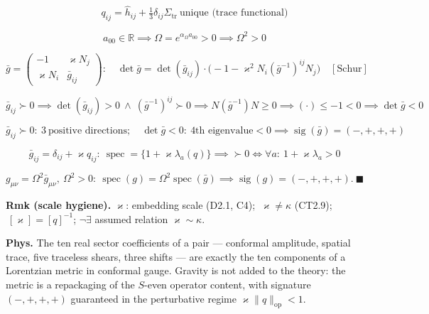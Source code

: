 \begin{theorem}
\[
\qquad q_{ij}=\hat h_{ij}+\tfrac13\delta_{ij}\Sigma_{\mathrm{tr}}\ \text{unique (trace functional)}
\]

\[
a_{00}\in\mathbb R\implies\Omega=e^{\alpha_\Omega a_{00}}>0\implies\Omega^2>0
\]

\[
\bar g=\begin{pmatrix}-1&\varkappa N_j\\ \varkappa N_i&\bar g_{ij}\end{pmatrix}:\quad
\det\bar g=\det(\bar g_{ij})\cdot\bigl(-1-\varkappa^2N_i(\bar g^{-1})^{ij}N_j\bigr)\quad[\text{Schur}]
\]

\[
\bar g_{ij}\succ0\implies\det(\bar g_{ij})>0\ \wedge\ (\bar g^{-1})^{ij}\succ0\implies N(\bar g^{-1})N\ge0\implies(\cdot)\le-1<0\implies\det\bar g<0
\]

\[
\bar g_{ij}\succ0:\ 3\ \text{positive directions};\quad\det\bar g<0:\ \text{4th eigenvalue}<0\implies\operatorname{sig}(\bar g)=(-,+,+,+)
\]

\[
\bar g_{ij}=\delta_{ij}+\varkappa q_{ij}:\ \operatorname{spec}=\{1+\varkappa\lambda_a(q)\}\implies\succ0\iff\forall a:\ 1+\varkappa\lambda_a>0
\]

\[
g_{\mu\nu}=\Omega^2\bar g_{\mu\nu},\ \Omega^2>0:\ \operatorname{spec}(g)=\Omega^2\operatorname{spec}(\bar g)\implies\operatorname{sig}(g)=(-,+,+,+).\ \blacksquare
\]

\textbf{Rmk (scale hygiene).} $\varkappa$: embedding scale (D2.1, C4); $\ \varkappa\ne\kappa$ (CT2.9); $\ [\varkappa]=[q]^{-1}$; $\neg\exists$ assumed relation $\varkappa\sim\kappa$.

\textbf{Phys.} The ten real sector coefficients of a pair — conformal amplitude, spatial trace, five traceless shears, three shifts — are exactly the ten components of a Lorentzian metric in conformal gauge. Gravity is not added to the theory: the metric is a repackaging of the $S$-even operator content, with signature $(-,+,+,+)$ guaranteed in the perturbative regime $\varkappa\|q\|_{\mathrm{op}}<1$.

\end{theorem}

